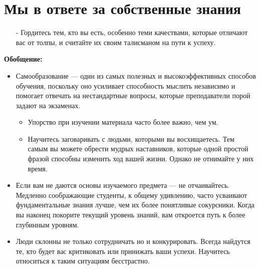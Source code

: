 \documentclass{article}
\begin{document}
\section{Мы в ответе за собственные знания}
\begin{itemize}
\item[-] Гордитесь тем, кто вы есть, особенно теми качествами, которые отличают вас от толпы, и считайте их своим талисманом на пути к успеху.
\end{itemize}
\textbf{Обобщение:}
\begin{itemize}
\item Самообразование --- один из самых полезных и высокоэффективных способов обучения, поскольку оно усиливает способность мыслить независимо и помогает отвечать на нестандартные вопросы, которые преподаватели порой задают на экзаменах.
\begin{itemize}
\item Упорство при изучении материала часто более важно, чем ум.
\item Научитесь заговаривать с людьми, которыми вы восхищаетесь. Тем самым вы можете обрести мудрых наставников, которые одной простой фразой способны изменить ход вашей жизни. Однако не отнимайте у них время.
\end{itemize}
\item Если вам не даются основы изучаемого предмета --- не отчаивайтесь. Медленно соображающие студенты, к общему удивлению, часто усваивают фундаментальные знания лучше, чем их более понятливые сокурсники. Когда вы наконец покорите текущий уровень знаний, вам откроется путь к более глубинным уровням.
\item Люди склонны не только сотрудничать но и конкурировать. Всегда найдутся те, кто будет вас критиковать или принижать ваши успехи. Научитесь относиться к таким ситуациям бесстрастно.
\end{itemize}
\end{document}
